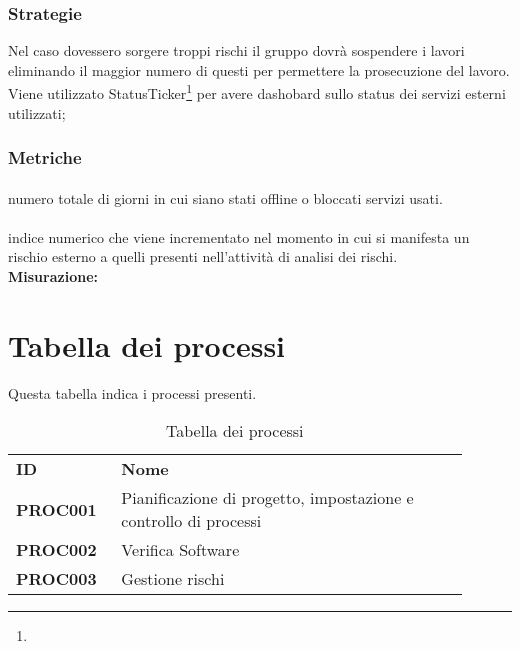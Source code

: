 \documentclass[PianoDiQualifica.tex]{subfiles}
\begin{document}
\subsubsection{Strategie}
Nel caso dovessero sorgere troppi rischi il gruppo dovrà sospendere i lavori eliminando il maggior numero di questi per permettere la prosecuzione del lavoro.
Viene utilizzato StatusTicker\footnote{} per avere dashobard sullo status dei servizi esterni utilizzati;

\subsubsection{Metriche}
\paragraph{}
 numero totale di giorni in cui siano stati offline o bloccati servizi usati.\\

\paragraph{}
 indice numerico che viene incrementato nel momento in cui si manifesta un
rischio esterno a quelli presenti nell’attività di analisi dei rischi.\\
\textbf{Misurazione:}


\section{Tabella dei processi}
Questa tabella indica i processi presenti.
\begin{table}[H]
	\begin{center}
		\begin{tabu} to 
			\tableHeaderStyle
			\textbf{ID} & \textbf{Nome} \\
			\textbf{PROC001} & {Pianificazione di progetto, impostazione e controllo di processi}\\ 
			\textbf{PROC002} & {Verifica Software}\\ 
			\textbf{PROC003} & {Gestione rischi}\\ 
			
		\end{tabu}
		\caption{Tabella dei processi}
		\vspace{-1em}
	\end{center}
\end{table}
\end{document}
